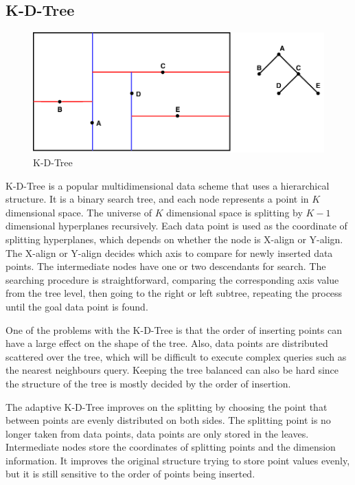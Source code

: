 \subsection{K-D-Tree}

\begin{figure}[ht]
\centering
\includegraphics[scale=0.75]{Figures/kdtree.pdf}
\caption{K-D-Tree}
\label{fig:kdtree}
\end{figure}

K-D-Tree \cite{Bentley:1975gn} is a popular multidimensional data scheme that uses a hierarchical structure. It is a binary search tree, and each node represents a point in ${K}$ dimensional space. The universe of ${K}$ dimensional space is splitting by ${K-1}$ dimensional hyperplanes recursively. Each data point is used as the coordinate of splitting hyperplanes, which depends on whether the node is X-align or Y-align. The X-align or Y-align decides which axis to compare for newly inserted data points. The intermediate nodes have one or two descendants for search. The searching procedure is straightforward, comparing the corresponding axis value from the tree level, then going to the right or left subtree, repeating the process until the goal data point is found. 

One of the problems with the K-D-Tree is that the order of inserting points can have a large effect on the shape of the tree. Also, data points are distributed scattered over the tree, which will be difficult to execute complex queries such as the nearest neighbours query. Keeping the tree balanced can also be hard since the structure of the tree is mostly decided by the order of insertion. 

The adaptive K-D-Tree \cite{Bentley:1975gn} improves on the splitting by choosing the point that between points are evenly distributed on both sides. The splitting point is no longer taken from data points, data points are only stored in the leaves. Intermediate nodes store the coordinates of splitting points and the dimension information. It improves the original structure trying to store point values evenly, but it is still sensitive to the order of points being inserted. 


